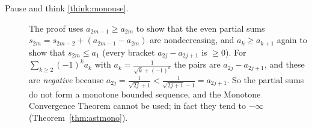 \documentclass[11pt]{article}
\begin{document}
\begin{description}
  \item[Pause and think \ref{think:monouse}.] The proof uses $a_{2m-1}\ge a_{2m}$ to show that the even partial sums $s_{2m}=s_{2m-2}+(a_{2m-1}-a_{2m})$ are nondecreasing, and $a_{k}\ge a_{k+1}$ again to show that $s_{2m}\le a_1$ (every bracket $a_{2j}-a_{2j+1}$ is $\ge0$). For $\sum_{k\ge2}(-1)^ka_k$ with $a_k=\frac1{\sqrt k+(-1)^k}$ the pairs are $a_{2j}-a_{2j+1}$, and these are \emph{negative} because $a_{2j}=\frac1{\sqrt{2j}+1}<\frac1{\sqrt{2j+1}-1}=a_{2j+1}$. So the partial sums do not form a monotone bounded sequence, and the Monotone Convergence Theorem cannot be used; in fact they tend to $-\infty$ (Theorem~\ref{thm:astmono}).
\end{description}
\end{document}

